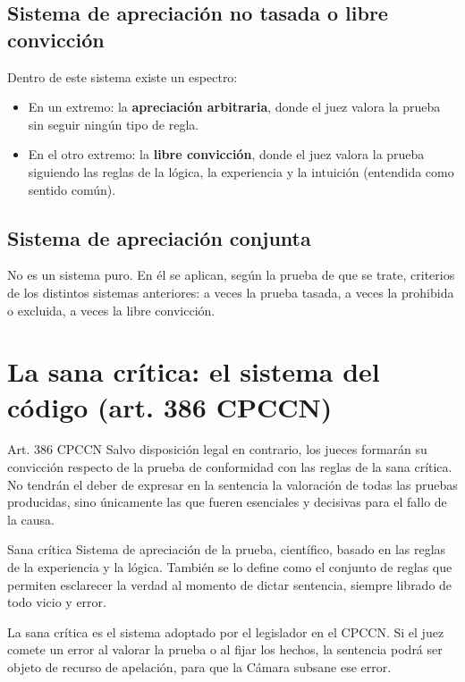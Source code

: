 \documentclass[12pt,oneside]{book}
\begin{document}
\subsection{Sistema de apreciación no tasada o libre convicción}

Dentro de este sistema existe un espectro:
\begin{itemize}
    \item En un extremo: la \textbf{apreciación arbitraria}, donde el juez valora la prueba sin seguir ningún tipo de regla.
    \item En el otro extremo: la \textbf{libre convicción}, donde el juez valora la prueba siguiendo las reglas de la lógica, la experiencia y la intuición (entendida como sentido común).
\end{itemize}

\subsection{Sistema de apreciación conjunta}

No es un sistema puro. En él se aplican, según la prueba de que se trate, criterios de los distintos sistemas anteriores: a veces la prueba tasada, a veces la prohibida o excluida, a veces la libre convicción.

\section{La sana crítica: el sistema del código (art. 386 CPCCN)}

\begin{articulo}{Art. 386 CPCCN}
Salvo disposición legal en contrario, los jueces formarán su convicción respecto de la prueba de conformidad con las reglas de la sana crítica. No tendrán el deber de expresar en la sentencia la valoración de todas las pruebas producidas, sino únicamente las que fueren esenciales y decisivas para el fallo de la causa.
\end{articulo}

\begin{definition}{Sana crítica}
Sistema de apreciación de la prueba, científico, basado en las reglas de la experiencia y la lógica. También se lo define como el conjunto de reglas que permiten esclarecer la verdad al momento de dictar sentencia, siempre librado de todo vicio y error.
\end{definition}

La sana crítica es el sistema adoptado por el legislador en el CPCCN. Si el juez comete un error al valorar la prueba o al fijar los hechos, la sentencia podrá ser objeto de recurso de apelación, para que la Cámara subsane ese error.
\end{document}
